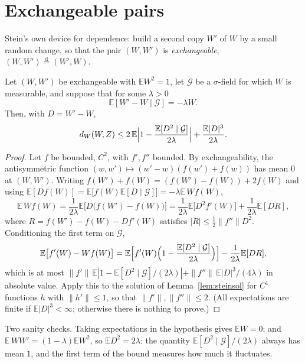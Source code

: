 \section{Exchangeable pairs}

Stein's own device for dependence: build a second copy $W'$ of $W$ by a small random change, so that the pair $(W,W')$ is \emph{exchangeable},
$(W,W')\overset{\mathrm d}=(W',W)$.

\begin{theorem}\label{thm:exch}
Let $(W,W')$ be exchangeable with $\mathbb EW^2=1$, let $\mathcal G$ be a $\sigma$-field for which $W$ is measurable, and suppose that for some $\lambda>0$
\[
\mathbb E[W'-W\mid\mathcal G]=-\lambda W.
\]
Then, with $D=W'-W$,
\[
d_W(W,Z)\le2\,\mathbb E\Bigl|1-\frac{\mathbb E[D^2\mid\mathcal G]}{2\lambda}\Bigr|+\frac{\mathbb E|D|^3}{2\lambda}.
\]
\end{theorem}
\begin{proof}
Let $f$ be bounded, $C^2$, with $f',f''$ bounded. By exchangeability, the antisymmetric function $(w,w')\mapsto(w'-w)(f(w')+f(w))$ has mean $0$ at $(W,W')$.
Writing $f(W')+f(W)=(f(W')-f(W))+2f(W)$ and using $\mathbb E[Df(W)]=\mathbb E\bigl[f(W)\mathbb E[D\mid\mathcal G]\bigr]=-\lambda\mathbb E\,Wf(W)$,
\[
\mathbb E\,Wf(W)=\frac1{2\lambda}\mathbb E\bigl[D\bigl(f(W')-f(W)\bigr)\bigr]=\frac1{2\lambda}\mathbb E\bigl[D^2f'(W)\bigr]+\frac1{2\lambda}\mathbb E[DR],
\]
where $R=f(W')-f(W)-Df'(W)$ satisfies $|R|\le\frac12\|f''\|D^2$. Conditioning the first term on $\mathcal G$,
\[
\mathbb E\bigl[f'(W)-Wf(W)\bigr]=\mathbb E\Bigl[f'(W)\Bigl(1-\frac{\mathbb E[D^2\mid\mathcal G]}{2\lambda}\Bigr)\Bigr]-\frac1{2\lambda}\mathbb E[DR],
\]
which is at most $\|f'\|\,\mathbb E|1-\mathbb E[D^2\mid\mathcal G]/(2\lambda)|+\|f''\|\,\mathbb E|D|^3/(4\lambda)$ in absolute value. Apply this to the solution of Lemma~\ref{lem:steinsol}
for $C^1$ functions $h$ with $\|h'\|\le1$, so that $\|f'\|,\|f''\|\le2$. (All expectations are finite if $\mathbb E|D|^3<\infty$; otherwise there is nothing to prove.)
\end{proof}

Two sanity checks. Taking expectations in the hypothesis gives $\mathbb EW=0$; and $\mathbb E\,WW'=(1-\lambda)\mathbb EW^2$, so $\mathbb ED^2=2\lambda$: the quantity
$\mathbb E[D^2\mid\mathcal G]/(2\lambda)$ always has mean $1$, and the first term of the bound measures how much it fluctuates.

